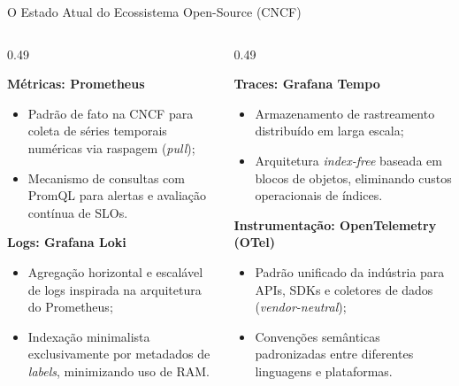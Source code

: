 \documentclass[aspectratio=169, 10pt]{beamer}
\begin{document}
\begin{frame}{O Estado Atual do Ecossistema Open-Source (CNCF)}
  \begin{columns}[T]
    \begin{column}{0.49\textwidth}
      \begin{block}{\textbf{Métricas: Prometheus}}
        \small
        \begin{itemize}
          \item Padrão de fato na CNCF para coleta de séries temporais numéricas via raspagem (\textit{pull});
          \item Mecanismo de consultas com PromQL para alertas e avaliação contínua de SLOs.
        \end{itemize}
      \end{block}
      \vspace{0.8ex}
      \begin{block}{\textbf{Logs: Grafana Loki}}
        \small
        \begin{itemize}
          \item Agregação horizontal e escalável de logs inspirada na arquitetura do Prometheus;
          \item Indexação minimalista exclusivamente por metadados de \textit{labels}, minimizando uso de RAM.
        \end{itemize}
      \end{block}
    \end{column}
    
    \begin{column}{0.49\textwidth}
      \begin{block}{\textbf{Traces: Grafana Tempo}}
        \small
        \begin{itemize}
          \item Armazenamento de rastreamento distribuído em larga escala;
          \item Arquitetura \textit{index-free} baseada em blocos de objetos, eliminando custos operacionais de índices.
        \end{itemize}
      \end{block}
      \vspace{0.8ex}
      \begin{block}{\textbf{Instrumentação: OpenTelemetry (OTel)}}
        \small
        \begin{itemize}
          \item Padrão unificado da indústria para APIs, SDKs e coletores de dados (\textit{vendor-neutral});
          \item Convenções semânticas padronizadas entre diferentes linguagens e plataformas.
        \end{itemize}
      \end{block}
    \end{column}
  \end{columns}
\end{frame}
\end{document}

